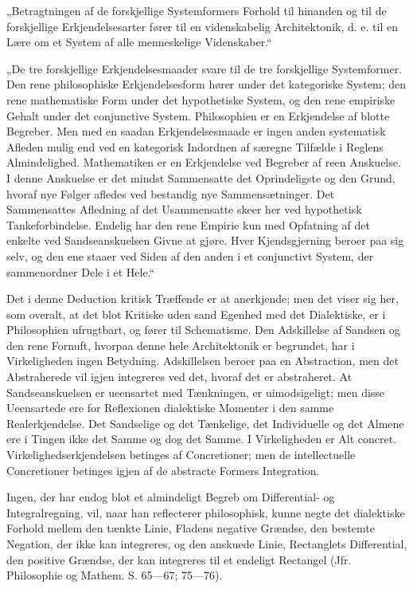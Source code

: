 \documentclass[12pt]{book}
\newcommand{\opage}[1]{\marginnote{\footnotesize\textit{[#1]}}}
\begin{document}
„Betragtningen af de forskjellige Systemformers Forhold til hinanden og til de forskjellige
Erkjendelsesarter fører til en videnskabelig Architektonik, d. e. til en Lære om et System
af alle menneskelige Videnskaber.“

„De tre forskjellige Erkjendelsesmaader svare til de tre forskjellige Systemformer. Den
rene philosophiske Erkjendelsesform hører under det kategoriske System; den rene
mathematiske Form under det hypothetiske System, og den rene empiriske Gehalt under det
conjunctive System. Philosophien er en Erkjendelse af blotte Begreber. Men med en saadan
Erkjendelsesmaade er ingen anden systematisk Afleden mulig end ved en kategorisk Indordnen
af særegne Tilfælde i Reglens Almindelighed. Mathematiken er en Erkjendelse ved Begreber af
reen Anskuelse. I denne Anskuelse er det mindst Sammensatte det Oprindeligste og den Grund,
hvoraf nye Følger afledes ved bestandig nye Sammensætninger. Det Sammensattes Afledning af
det Usammensatte skeer her ved hypothetisk Tankeforbindelse. Endelig har den rene Empirie
kun med Opfatning af det enkelte ved Sandseanskuelsen Givne at gjøre. Hver Kjendsgjerning
beroer paa sig selv, og den ene staaer ved Siden af den anden i et conjunctivt System, der
sammenordner Dele i et Hele.“

Det i denne Deduction kritisk Træffende er at anerkjende; men det viser sig her, som
overalt, at det blot Kritiske uden sand Egenhed med det Dialektiske, er i Philosophien
ufrugtbart, og fører til Schematisme. Den Adskillelse af Sandsen og den rene Fornuft,
hvorpaa denne hele Architektonik er begrundet, har i Virkeligheden ingen Betydning.
Adskillelsen beroer paa en Abstraction, men det Abstraherede vil igjen integreres ved det,
hvoraf det er abstraheret.
\opage{87} At Sandseanskuelsen er ueensartet med Tænkningen, er uimodsigeligt; men disse Ueensartede
ere for Reflexionen dialektiske Momenter i den samme Realerkjendelse. Det Sandselige og det
Tænkelige, det Individuelle og det Almene ere i Tingen ikke det Samme og dog det Samme. I
Virkeligheden er Alt concret. Virkelighedserkjendelsen betinges af Concretioner; men de
intellectuelle Concretioner betinges igjen af de abstracte Formers Integration.

Ingen, der har endog blot et almindeligt Begreb om Differential- og Integralregning, vil,
naar han reflecterer philosophisk, kunne negte det dialektiske Forhold mellem den tænkte
Linie, Fladens negative Grændse, den bestemte Negation, der ikke kan integreres, og den
anskuede Linie, Rectanglets Differential, den positive Grændse, der kan integreres til et
endeligt Rectangel (Jfr. Philosophie og Mathem. S. 65—67; 75—76).
\end{document}
